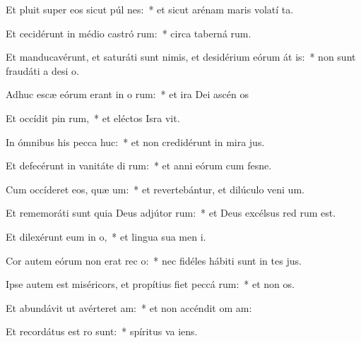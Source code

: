 \item Et pluit super eos sicut púl nes:~* et sicut arénam maris volatí ta.
\item Et cecidérunt in médio castró rum:~* circa taberná rum.
\item Et manducavérunt, et saturáti sunt nimis, et desidérium eórum át is:~* non sunt fraudáti a desi o.
\item Adhuc escæ eórum erant in o rum:~* et ira Dei ascén  os
\item Et occídit pin rum,~* et eléctos Isra vit.
\item In ómnibus his pecca huc:~* et non credidérunt in mira jus.
\item Et defecérunt in vanitáte di rum:~* et anni eórum cum fesne.
\item Cum occíderet eos, quæ um:~* et revertebántur, et dilúculo veni  um.
\item Et rememoráti sunt quia Deus adjútor  rum:~* et Deus excélsus red rum est.
\item Et dilexérunt eum in  o,~* et lingua sua men  i.
\item Cor autem eórum non erat rec  o:~* nec fidéles hábiti sunt in tes jus.
\item Ipse autem est miséricors, et propítius fiet peccá rum:~* et non  os.
\item Et abundávit ut avérteret  am:~* et non accéndit om  am:
\item Et recordátus est  ro sunt:~* spíritus va   iens.
